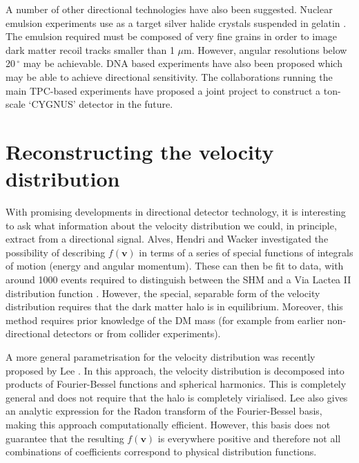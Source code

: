 
A number of other directional technologies have also been suggested. Nuclear emulsion experiments use as a target silver halide crystals suspended in gelatin \cite{Naka:2012}. The emulsion required must be composed of very fine grains in order to image dark matter recoil tracks smaller than 1 $\mu \textrm{m}$. However, angular resolutions below 20$\,^{\circ}$ may be achievable. DNA based experiments \cite{Drukier:2012} have also been proposed which may be able to achieve directional sensitivity. The collaborations running the main TPC-based experiments have proposed a joint project to construct a ton-scale `CYGNUS' detector \cite{Ahlen:2009} in the future.


\section{Reconstructing the velocity distribution}

With promising developments in directional detector technology, it is interesting to ask what information about the velocity distribution we could, in principle, extract from a directional signal. Alves, Hendri and Wacker \cite{Alves:2012} investigated the possibility of describing $f(\textbf{v})$ in terms of a series of special functions of integrals of motion (energy and angular momentum). These can then be fit to data, with around 1000 events required to distinguish between the SHM and a Via Lactea II distribution function \cite{Kuhlen:2008}. However, the special, separable form of the velocity distribution requires that the dark matter halo is in equilibrium. Moreover, this method requires prior knowledge of the DM mass (for example from earlier non-directional detectors or from collider experiments).

A more general parametrisation for the velocity distribution was recently proposed by Lee \cite{Lee:2014}. In this approach, the velocity distribution is decomposed into products of Fourier-Bessel functions and spherical harmonics. This is completely general and does not require that the halo is completely virialised. Lee also gives an analytic expression for the Radon transform of the Fourier-Bessel basis, making this approach computationally efficient. However, this basis does not guarantee that the resulting $f(\textbf{v})$ is everywhere positive and therefore not all combinations of coefficients correspond to physical distribution functions. %

